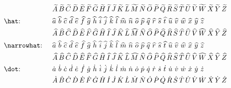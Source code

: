 \documentclass[parskip]{myarticle}
\begin{document}
\begin{align*}
    &&&\narrowtilde{A}\,\narrowtilde{B}\,\narrowtilde{C}\,\narrowtilde{D}\,\narrowtilde{E}\,\narrowtilde{F}\,\narrowtilde{G}\,\narrowtilde{H}\,\narrowtilde{I}\,\narrowtilde{J}\,\narrowtilde{K}\,\narrowtilde{L}\,\narrowtilde{M}\,\narrowtilde{N}\,\narrowtilde{O}\,\narrowtilde{P}\,\narrowtilde{Q}\,\narrowtilde{R}\,\narrowtilde{S}\,\narrowtilde{T}\,\narrowtilde{U}\,\narrowtilde{V}\,\narrowtilde{W}\,\narrowtilde{X}\,\narrowtilde{Y}\,\narrowtilde{Z} \\
    &\text{\texttt{\textbackslash hat}: } &&\hat{a}\,\,\hat{b}\,\,\hat{c}\,\,\hat{d}\,\,\hat{e}\,\,\hat{f}\,\,\hat{g}\,\,\hat{h}\,\,\hat{i}\,\,\hat{j}\,\,\hat{k}\,\,\hat{l}\,\,\hat{m}\,\,\hat{n}\,\,\hat{o}\,\,\hat{p}\,\,\hat{q}\,\,\hat{r}\,\,\hat{s}\,\,\hat{t}\,\,\hat{u}\,\,\hat{v}\,\,\hat{w}\,\,\hat{x}\,\,\hat{y}\,\,\hat{z} \\
    &&&\hat{A}\,\hat{B}\,\hat{C}\,\hat{D}\,\hat{E}\,\hat{F}\,\hat{G}\,\hat{H}\,\hat{I}\,\hat{J}\,\hat{K}\,\hat{L}\,\hat{M}\,\hat{N}\,\hat{O}\,\hat{P}\,\hat{Q}\,\hat{R}\,\hat{S}\,\hat{T}\,\hat{U}\,\hat{V}\,\hat{W}\,\hat{X}\,\hat{Y}\,\hat{Z} \\
    &\text{\texttt{\textbackslash narrowhat}: } &&\narrowhat{a}\,\,\narrowhat{b}\,\,\narrowhat{c}\,\,\narrowhat{d}\,\,\narrowhat{e}\,\,\narrowhat{f}\,\,\narrowhat{g}\,\,\narrowhat{h}\,\,\narrowhat{i}\,\,\narrowhat{j}\,\,\narrowhat{k}\,\,\narrowhat{l}\,\,\narrowhat{m}\,\,\narrowhat{n}\,\,\narrowhat{o}\,\,\narrowhat{p}\,\,\narrowhat{q}\,\,\narrowhat{r}\,\,\narrowhat{s}\,\,\narrowhat{t}\,\,\narrowhat{u}\,\,\narrowhat{v}\,\,\narrowhat{w}\,\,\narrowhat{x}\,\,\narrowhat{y}\,\,\narrowhat{z} \\
    &&&\narrowhat{A}\,\narrowhat{B}\,\narrowhat{C}\,\narrowhat{D}\,\narrowhat{E}\,\narrowhat{F}\,\narrowhat{G}\,\narrowhat{H}\,\narrowhat{I}\,\narrowhat{J}\,\narrowhat{K}\,\narrowhat{L}\,\narrowhat{M}\,\narrowhat{N}\,\narrowhat{O}\,\narrowhat{P}\,\narrowhat{Q}\,\narrowhat{R}\,\narrowhat{S}\,\narrowhat{T}\,\narrowhat{U}\,\narrowhat{V}\,\narrowhat{W}\,\narrowhat{X}\,\narrowhat{Y}\,\narrowhat{Z} \\
    &\text{\texttt{\textbackslash dot}: } &&\dot{a}\,\,\dot{b}\,\,\dot{c}\,\,\dot{d}\,\,\dot{e}\,\,\dot{f}\,\,\dot{g}\,\,\dot{h}\,\,\dot{i}\,\,\dot{j}\,\,\dot{k}\,\,\dot{l}\,\,\dot{m}\,\,\dot{n}\,\,\dot{o}\,\,\dot{p}\,\,\dot{q}\,\,\dot{r}\,\,\dot{s}\,\,\dot{t}\,\,\dot{u}\,\,\dot{v}\,\,\dot{w}\,\,\dot{x}\,\,\dot{y}\,\,\dot{z} \\
    &&&\dot{A}\,\dot{B}\,\dot{C}\,\dot{D}\,\dot{E}\,\dot{F}\,\dot{G}\,\dot{H}\,\dot{I}\,\dot{J}\,\dot{K}\,\dot{L}\,\dot{M}\,\dot{N}\,\dot{O}\,\dot{P}\,\dot{Q}\,\dot{R}\,\dot{S}\,\dot{T}\,\dot{U}\,\dot{V}\,\dot{W}\,\dot{X}\,\dot{Y}\,\dot{Z} \\

\end{align*}
\end{document}
